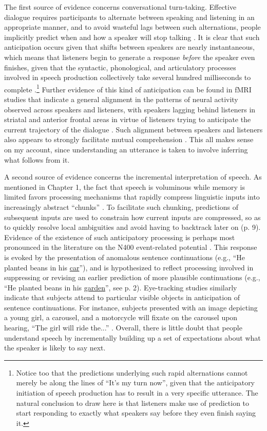 The first source of evidence concerns conversational turn-taking. Effective dialogue requires participants to alternate between speaking and listening in an appropriate manner, and to avoid wasteful lags between such alternations, people implicitly predict when and how a speaker will stop talking \citep{Christiansen:2015,Pickering:2013}. It is clear that such anticipation occurs given that shifts between speakers are nearly instantaneous, which means that listeners begin to generate a response \textit{before} the speaker even finishes, given that the syntactic, phonological, and articulatory processes involved in speech production collectively take several hundred milliseconds to complete \citep{Pickering:2013}.\footnote{Notice too that the predictions underlying such rapid alternations cannot merely be along the lines of ``It's my turn now'', given that the anticipatory initiation of speech production has to result in a very specific utterance. The natural conclusion to draw here is that listeners make use of prediction to start responding to exactly what speakers say before they even finish saying it.} Further evidence of this kind of anticipation can be found in fMRI studies that indicate a general alignment in the patterns of neural activity observed across speakers and listeners, with speakers lagging behind listeners in striatal and anterior frontal areas in virtue of listeners trying to anticipate the current trajectory of the dialogue \citep[reviewed in][]{Christiansen:2015}.  Such alignment between speakers and listeners also appears to strongly facilitate mutual comprehension \citep{Pickering:2013,Christiansen:2015}. This all makes sense on my account, since understanding an utterance is taken to involve inferring what follows from it. 

A second source of evidence concerns the incremental interpretation of speech. As mentioned in Chapter 1, the fact that speech is voluminous while memory is limited favors processing mechanisms that rapidly compress linguistic inputs into increasingly abstract ``chunks'' \citep{Christiansen:2015}. To facilitate such chunking, predictions of subsequent inputs are used to constrain how current inputs are compressed, so as to quickly resolve local ambiguities and avoid having to backtrack later on (p. 9). Evidence of the existence of such anticipatory processing is perhaps most pronounced in the literature on the N400 event-related potential \citep{Federmeier:2007,Kutas:2011}. This response is evoked by the presentation of anomalous sentence continuations (e.g., ``He planted beans in his \underline{car}''), and is hypothesized to reflect processing involved in suppressing or revising an earlier prediction of more plausible continuations (e.g., ``He planted beans in his \underline{garden}'', see p. 2). Eye-tracking studies similarly indicate that subjects attend to particular visible objects in anticipation of sentence continuations. For instance, subjects presented with an image depicting a young girl, a carousel, and a motorcycle will fixate on the carousel upon hearing, ``The girl will ride the...'' \citep[][p. 194]{Kutas:2009}. Overall, there is little doubt that people understand speech by incrementally building up a set of expectations about what the speaker is likely to say next. 

